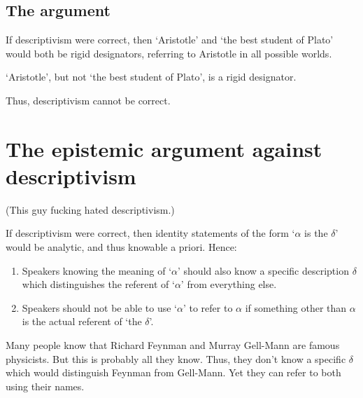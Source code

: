 \subsection{The argument}

\begin{argument}\leavevmode
\begin{premises}
  \item[P1)] If descriptivism were correct, then `Aristotle' and `the best student of Plato' would both be rigid designators, referring to Aristotle in all possible worlds.
  \item[P2)] `Aristotle', but not `the best student of Plato', is a rigid designator.
  \item[C)] Thus, descriptivism cannot be correct.
\end{premises}
\end{argument}

\section{The epistemic argument against descriptivism}

(This guy fucking hated descriptivism.)

\begin{argument}\leavevmode
\begin{premises}
  \item[P1)] If descriptivism were correct, then identity statements of the form `$\alpha$ is the $\delta$' would be analytic, and thus knowable a priori. Hence:
  \begin{enumerate}[label=\roman*.]
    \item Speakers knowing the meaning of `$\alpha$' should also know a specific description $\delta$ which distinguishes the referent of `$\alpha$' from everything else.
    \item Speakers should not be able to use `$\alpha$' to refer to $\alpha$ if something other than $\alpha$ is the actual referent of `the $\delta$'.
  \end{enumerate}
\end{premises}
\end{argument}

\begin{example}[Counterexample]
Many people know that Richard Feynman and Murray Gell-Mann are famous physicists. But this is probably all they know. Thus, they don't know a specific $\delta$ which would distinguish Feynman from Gell-Mann. Yet they can refer to both using their names.
\end{example}

